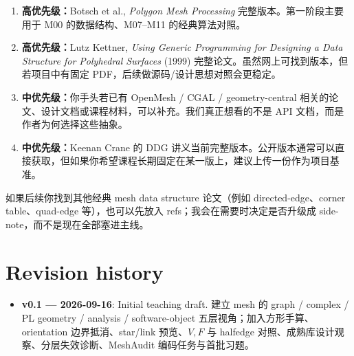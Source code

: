 \documentclass[UTF8,11pt]{ctexart}
\begin{document}
\begin{enumerate}
  \item \textbf{高优先级：}Botsch et al., \emph{Polygon Mesh Processing} 完整版本。第一阶段主要用于 M00 的数据结构、M07--M11 的经典算法对照。

  \item \textbf{高优先级：}Lutz Kettner, \emph{Using Generic Programming for Designing a Data Structure for Polyhedral Surfaces} (1999) 完整论文。虽然网上可找到版本，但若项目中有固定 PDF，后续做源码/设计思想对照会更稳定。

  \item \textbf{中优先级：}你手头若已有 OpenMesh / CGAL / geometry-central 相关的论文、设计文档或课程材料，可以补充。我们真正想看的不是 API 文档，而是作者为何选择这些抽象。

  \item \textbf{中优先级：}Keenan Crane 的 DDG 讲义当前完整版本。公开版本通常可以直接获取，但如果你希望课程长期固定在某一版上，建议上传一份作为项目基准。
\end{enumerate}

如果后续你找到其他经典 mesh data structure 论文（例如 directed-edge、corner table、quad-edge 等），也可以先放入 refs；我会在需要时决定是否升级成 side-note，而不是现在全部塞进主线。

\section*{Revision history}

\begin{itemize}
  \item \textbf{v0.1 — 2026-09-16}: Initial teaching draft. 建立 mesh 的 graph / complex / PL geometry / analysis / software-object 五层视角；加入方形手算、orientation 边界抵消、star/link 预览、$V,F$ 与 halfedge 对照、成熟库设计观察、分层失效诊断、MeshAudit 编码任务与首批习题。
\end{itemize}
\end{document}
